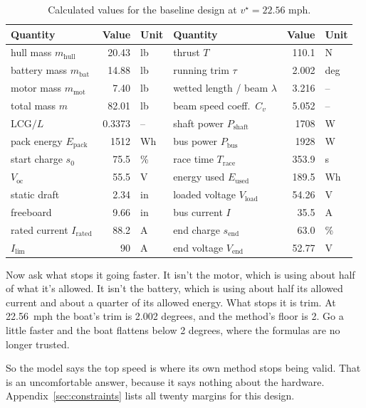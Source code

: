 \documentclass[11pt,a4paper]{article}
\renewcommand{\_}{\textunderscore\allowbreak}
\newcommand{\Trace}{T_{\mathrm{race}}}
\newcommand{\Pshaft}{P_{\mathrm{shaft}}}
\newcommand{\Pbus}{P_{\mathrm{bus}}}
\newcommand{\Eused}{E_{\mathrm{used}}}
\newcommand{\Epack}{E_{\mathrm{pack}}}
\newcommand{\Voc}{V_{\mathrm{oc}}}
\newcommand{\Vload}{V_{\mathrm{load}}}
\newcommand{\Vend}{V_{\mathrm{end}}}
\newcommand{\lcg}{\mathrm{LCG}}
\begin{document}
\begin{table}[H]
\centering\small
\caption{Calculated values for the baseline design at $v^\star=22.56$ mph.}
\begin{tabular}{@{}l r l @{\qquad} l r l@{}}
\toprule
Quantity & Value & Unit & Quantity & Value & Unit \\
\midrule
hull mass $m_{\mathrm{hull}}$ & 20.43 & lb  & thrust $T$ & 110.1 & N \\
battery mass $m_{\mathrm{bat}}$ & 14.88 & lb & running trim $\tau$ & 2.002 & deg \\
motor mass $m_{\mathrm{mot}}$ & 7.40 & lb   & wetted length / beam $\lambda$ & 3.216 & -- \\
total mass $m$ & 82.01 & lb                  & beam speed coeff.\ $C_v$ & 5.052 & -- \\
$\lcg/L$ & 0.3373 & --                       & shaft power $\Pshaft$ & 1708 & W \\
pack energy $\Epack$ & 1512 & Wh            & bus power $\Pbus$ & 1928 & W \\
start charge $s_0$ & 75.5 & \%              & race time $\Trace$ & 353.9 & s \\
$\Voc$ & 55.5 & V                           & energy used $\Eused$ & 189.5 & Wh \\
static draft & 2.34 & in                     & loaded voltage $\Vload$ & 54.26 & V \\
freeboard & 9.66 & in                        & bus current $I$ & 35.5 & A \\
rated current $I_{\mathrm{rated}}$ & 88.2 & A & end charge $s_{\mathrm{end}}$ & 63.0 & \% \\
$I_{\lim}$ & 90 & A                          & end voltage $\Vend$ & 52.77 & V \\
\bottomrule
\end{tabular}
\end{table}

Now ask what stops it going faster. It isn't the motor, which is using about half of what it's allowed. It isn't the battery, which is using about half its allowed current and about a quarter of its allowed energy.
What stops it is trim. At 22.56~mph the boat's trim is 2.002 degrees, and the method's floor is 2. Go a little faster and the boat flattens below 2 degrees, where the formulas are no longer trusted.

So the model says the top speed is where its own method stops being valid. That is an uncomfortable answer, because it says nothing about the hardware. Appendix~\ref{sec:constraints} lists all twenty margins for this design.
\end{document}
